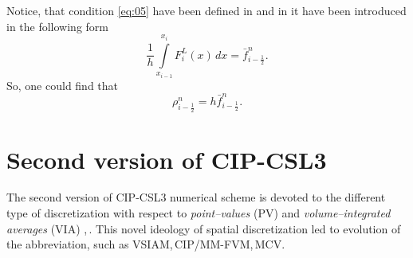 \documentclass[10pt,a4paper]{article}
\begin{document}
Notice, that condition \eqref{eq:05} have been defined in \cite{Xiao2001} and in \cite{Xiao2003} it have been introduced in the following form
$$
\dfrac{1}{h}\int\limits_{x_{i-1}}^{x_i} F_i^L(x)\,dx = \bar{f}_{i-\frac{1}{2}}^n.
$$
So, one could find that
$$
\rho_{i-\frac{1}{2}}^n = h\bar{f}_{i-\frac{1}{2}}^n.
$$


\section{Second version of CIP-CSL3}
The second version of CIP-CSL3 numerical scheme is devoted to the different type of
discretization with respect to \emph{point--values} (PV) and \emph{volume--integrated averages} (VIA) \cite{IiXiao2007},\,\cite{IiXiao2009}. This novel ideology of spatial discretization led to evolution of the abbreviation, such as VSIAM,\,CIP/MM-FVM,\,MCV.


\end{document}
